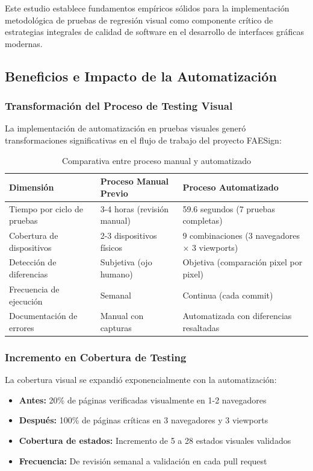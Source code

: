 \documentclass{article}
\begin{document}
Este estudio establece fundamentos empíricos sólidos para la implementación metodológica de pruebas de regresión visual como componente crítico de estrategias integrales de calidad de software en el desarrollo de interfaces gráficas modernas.

\subsection{Beneficios e Impacto de la Automatización}

\subsubsection{Transformación del Proceso de Testing Visual}

La implementación de automatización en pruebas visuales generó transformaciones significativas en el flujo de trabajo del proyecto FAESign:

\begin{table}[H]
\centering
\begin{tabular}{|p{3.5cm}|p{5.5cm}|p{5.5cm}|}
\hline
\textbf{Dimensión} & \textbf{Proceso Manual Previo} & \textbf{Proceso Automatizado} \\
\hline
Tiempo por ciclo de pruebas & 3-4 horas (revisión manual) & 59.6 segundos (7 pruebas completas) \\
\hline
Cobertura de dispositivos & 2-3 dispositivos físicos & 9 combinaciones (3 navegadores × 3 viewports) \\
\hline
Detección de diferencias & Subjetiva (ojo humano) & Objetiva (comparación pixel por pixel) \\
\hline
Frecuencia de ejecución & Semanal & Continua (cada commit) \\
\hline
Documentación de errores & Manual con capturas & Automatizada con diferencias resaltadas \\
\hline
\end{tabular}
\caption{Comparativa entre proceso manual y automatizado}
\label{tab:automation-impact}
\end{table}

\subsubsection{Incremento en Cobertura de Testing}

La cobertura visual se expandió exponencialmente con la automatización:

\begin{itemize}[nosep]
\item \textbf{Antes:} 20\% de páginas verificadas visualmente en 1-2 navegadores
\item \textbf{Después:} 100\% de páginas críticas en 3 navegadores y 3 viewports
\item \textbf{Cobertura de estados:} Incremento de 5 a 28 estados visuales validados
\item \textbf{Frecuencia:} De revisión semanal a validación en cada pull request
\end{itemize}
\end{document}
